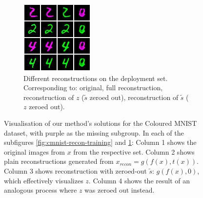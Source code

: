 \begin{figure}[tp]
\begin{subfigure}[b]{0.49\columnwidth}
    \includegraphics[width=\textwidth]{supmatch/example_images/copper-microwave-2174_context_reconstructions_9900.png}
    \caption{
    Different reconstructions on the deployment set. Corresponding to: original, full
    reconstruction, reconstruction of $z$ ($\tilde{s}$ zeroed out), reconstruction of $\tilde{s}$
    ($z$ zeroed out).
    }%
    \label{fig:cmnist-recon-deployment}
  \end{subfigure}
  \caption{
   Visualisation of our method's solutions for the Coloured MNIST dataset, with
   {\color{purple}purple} as the missing subgroup. In each of the subfigures
   \ref{fig:cmnist-recon-training} and \ref{fig:cmnist-recon-deployment}: Column 1 shows the
   original images from $x$ from the respective set. Column 2 shows plain reconstructions generated
   from $x_\textit{recon}=g(f(x), t(x))$. Column 3 shows reconstruction with zeroed-out
   $\tilde{s}$: $g(f(x), 0)$, which effectively visualizes $z$. Column 4 shows the result of an
   analogous process where $z$ was zeroed out instead.
  }%
  \label{fig:cmnist-recon}
\end{figure}%
%
